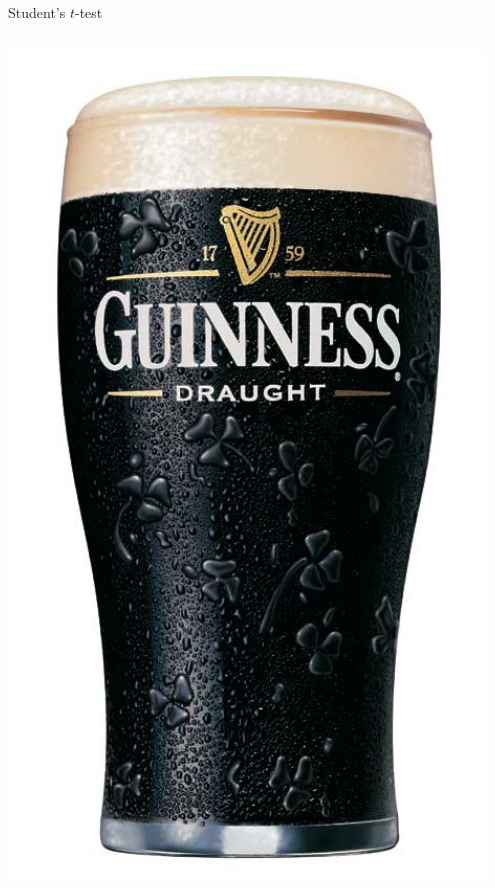 \documentclass[aspectratio=169]{beamer}\usepackage[]{graphicx}\usepackage[]{color}
\begin{document}
\begin{frame}{Student's $t$-test}
\begin{columns}
\begin{column}{0.25\textwidth}
\begin{center}
    	\includegraphics[width=0.95\textwidth]{./images/guinnessbeer.png}
  \end{center}
  \end{column}
\end{columns}
\end{frame}
\end{document}
